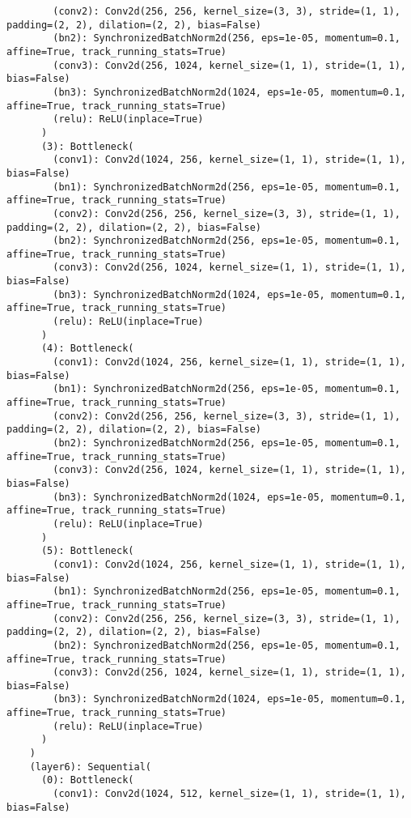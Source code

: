 \begin{verbatim}
        (conv2): Conv2d(256, 256, kernel_size=(3, 3), stride=(1, 1), padding=(2, 2), dilation=(2, 2), bias=False)
        (bn2): SynchronizedBatchNorm2d(256, eps=1e-05, momentum=0.1, affine=True, track_running_stats=True)
        (conv3): Conv2d(256, 1024, kernel_size=(1, 1), stride=(1, 1), bias=False)
        (bn3): SynchronizedBatchNorm2d(1024, eps=1e-05, momentum=0.1, affine=True, track_running_stats=True)
        (relu): ReLU(inplace=True)
      )
      (3): Bottleneck(
        (conv1): Conv2d(1024, 256, kernel_size=(1, 1), stride=(1, 1), bias=False)
        (bn1): SynchronizedBatchNorm2d(256, eps=1e-05, momentum=0.1, affine=True, track_running_stats=True)
        (conv2): Conv2d(256, 256, kernel_size=(3, 3), stride=(1, 1), padding=(2, 2), dilation=(2, 2), bias=False)
        (bn2): SynchronizedBatchNorm2d(256, eps=1e-05, momentum=0.1, affine=True, track_running_stats=True)
        (conv3): Conv2d(256, 1024, kernel_size=(1, 1), stride=(1, 1), bias=False)
        (bn3): SynchronizedBatchNorm2d(1024, eps=1e-05, momentum=0.1, affine=True, track_running_stats=True)
        (relu): ReLU(inplace=True)
      )
      (4): Bottleneck(
        (conv1): Conv2d(1024, 256, kernel_size=(1, 1), stride=(1, 1), bias=False)
        (bn1): SynchronizedBatchNorm2d(256, eps=1e-05, momentum=0.1, affine=True, track_running_stats=True)
        (conv2): Conv2d(256, 256, kernel_size=(3, 3), stride=(1, 1), padding=(2, 2), dilation=(2, 2), bias=False)
        (bn2): SynchronizedBatchNorm2d(256, eps=1e-05, momentum=0.1, affine=True, track_running_stats=True)
        (conv3): Conv2d(256, 1024, kernel_size=(1, 1), stride=(1, 1), bias=False)
        (bn3): SynchronizedBatchNorm2d(1024, eps=1e-05, momentum=0.1, affine=True, track_running_stats=True)
        (relu): ReLU(inplace=True)
      )
      (5): Bottleneck(
        (conv1): Conv2d(1024, 256, kernel_size=(1, 1), stride=(1, 1), bias=False)
        (bn1): SynchronizedBatchNorm2d(256, eps=1e-05, momentum=0.1, affine=True, track_running_stats=True)
        (conv2): Conv2d(256, 256, kernel_size=(3, 3), stride=(1, 1), padding=(2, 2), dilation=(2, 2), bias=False)
        (bn2): SynchronizedBatchNorm2d(256, eps=1e-05, momentum=0.1, affine=True, track_running_stats=True)
        (conv3): Conv2d(256, 1024, kernel_size=(1, 1), stride=(1, 1), bias=False)
        (bn3): SynchronizedBatchNorm2d(1024, eps=1e-05, momentum=0.1, affine=True, track_running_stats=True)
        (relu): ReLU(inplace=True)
      )
    )
    (layer6): Sequential(
      (0): Bottleneck(
        (conv1): Conv2d(1024, 512, kernel_size=(1, 1), stride=(1, 1), bias=False)

\end{verbatim}
